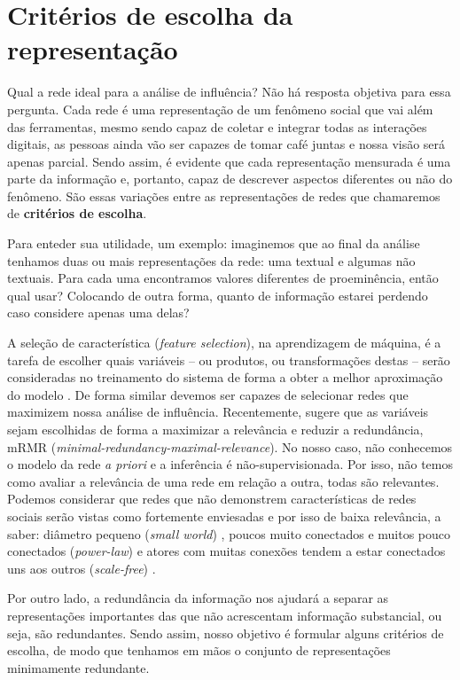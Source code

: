 \section{Critérios de escolha da representação}
\label{sec:criterios}
Qual a rede ideal para a análise de influência? Não há resposta objetiva para
essa pergunta. Cada rede é uma representação de um fenômeno social que vai além
das ferramentas, mesmo sendo capaz de coletar e integrar todas as interações
digitais, as pessoas ainda vão ser capazes de tomar café juntas e nossa visão
será apenas parcial. Sendo assim, é evidente que cada representação mensurada é
uma parte da informação e, portanto, capaz de descrever aspectos diferentes ou
não do fenômeno. São essas variações entre as representações de redes que
chamaremos de \textbf{critérios de escolha}.

Para enteder sua utilidade, um exemplo: imaginemos que ao final da análise
tenhamos duas ou mais representações da rede: uma textual e algumas não textuais.
Para cada uma encontramos valores diferentes de proeminência, então qual usar?
Colocando de outra forma, quanto de informação estarei perdendo caso considere
apenas uma delas?

A seleção de característica (\emph{feature selection}), na aprendizagem de
máquina, é a tarefa de escolher quais variáveis -- ou produtos, ou transformações
destas -- serão consideradas no treinamento do sistema de forma a obter a melhor
aproximação do modelo \citep{Jain1997, Blum1997, Jain2000}. De forma similar
devemos ser capazes de selecionar redes que maximizem nossa análise de
influência. Recentemente, \citet{Peng2005} sugere que as variáveis sejam
escolhidas de forma a maximizar a relevância e reduzir a redundância, mRMR
(\emph{minimal-redundancy-maximal-relevance}). No nosso caso, não conhecemos o
modelo da rede \emph{a priori} e a inferência é não-supervisionada. Por isso, não
temos como avaliar a relevância de uma rede em relação a outra, todas são
relevantes. Podemos considerar que redes que não demonstrem características de
redes sociais serão vistas como fortemente enviesadas e por isso de baixa
relevância, a saber: diâmetro pequeno (\emph{small world}) \citep{Milgram1967,
Watts1998}, poucos muito conectados e muitos pouco conectados (\emph{power-law})
\citep{Liljeros2001, Mitzenmacher2004} e atores com muitas conexões tendem a
estar conectados uns aos outros (\emph{scale-free}) \citep{Li2005}.

Por outro lado, a redundância da informação nos ajudará a separar as
representações importantes das que não acrescentam informação substancial, ou
seja, são redundantes. Sendo assim, nosso objetivo é formular alguns critérios
de escolha, de modo que tenhamos em mãos o conjunto de representações
minimamente redundante.

